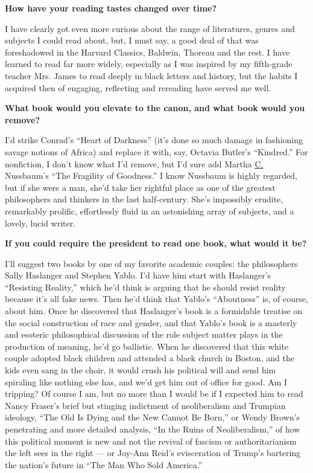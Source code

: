 \textbf{How have your reading tastes changed over time?}

I have clearly got even more curious about the range of literatures,
genres and subjects I could read about, but, I must say, a good deal of
that was foreshadowed in the Harvard Classics, Baldwin, Thoreau and the
rest. I have learned to read far more widely, especially as I was
inspired by my fifth-grade teacher Mrs. James to read deeply in black
letters and history, but the habits I acquired then of engaging,
reflecting and rereading have served me well.

\textbf{What book would you elevate to the canon, and what book would
you remove?}

I'd strike Conrad's ``Heart of Darkness'' (it's done so much damage in
fashioning savage notions of Africa) and replace it with, say, Octavia
Butler's ``Kindred.'' For nonfiction, I don't know what I'd remove, but
I'd sure add Martha
\href{https://www.cambridge.org/core/books/fragility-of-goodness/B212012979833A828690B9CA907A87BF}{C.}
Nussbaum's ``The Fragility of Goodness.'' I know Nussbaum is highly
regarded, but if she were a man, she'd take her rightful place as one of
the greatest philosophers and thinkers in the last half-century. She's
impossibly erudite, remarkably prolific, effortlessly fluid in an
astonishing array of subjects, and a lovely, lucid writer.

\textbf{If you could require the president to read one book, what would
it be?}

I'll suggest two books by one of my favorite academic couples: the
philosophers Sally Haslanger and Stephen Yablo. I'd have him start with
Haslanger's ``Resisting Reality,'' which he'd think is arguing that he
should resist reality because it's all fake news. Then he'd think that
Yablo's ``Aboutness'' is, of course, about him. Once he discovered that
Haslanger's book is a formidable treatise on the social construction of
race and gender, and that Yablo's book is a masterly and esoteric
philosophical discussion of the role subject matter plays in the
production of meaning, he'd go ballistic. When he discovered that this
white couple adopted black children and attended a black church in
Boston, and the kids even sang in the choir, it would crush his
political will and send him spiraling like nothing else has, and we'd
get him out of office for good. Am I tripping? Of course I am, but no
more than I would be if I expected him to read Nancy Fraser's brief but
stinging indictment of neoliberalism and Trumpian ideology, ``The Old Is
Dying and the New Cannot Be Born,'' or Wendy Brown's penetrating and
more detailed analysis, ``In the Ruins of Neoliberalism,'' of how this
political moment is new and not the revival of fascism or
authoritarianism the left sees in the right --- or Joy-Ann Reid's
evisceration of Trump's bartering the nation's future in ``The Man Who
Sold America.''

